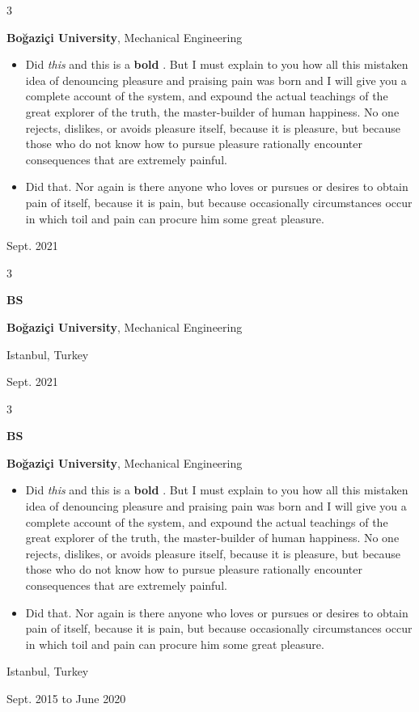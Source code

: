 \documentclass[10pt, letterpaper]{article}
\newenvironment{highlights}{
    \begin{itemize}[
        topsep=0.10 cm,
        parsep=0.10 cm,
        partopsep=0pt,
        itemsep=0pt,
        leftmargin=0.4 cm + 10pt
    ]
}{
    \end{itemize}
} %
\newenvironment{threecolentry}[3][]{
    \onecolentry
    \def\thirdColumn{#3}
    \setcolumnwidth{1 cm, \fill, 4.5 cm}
    \begin{paracol}{3}
    {\raggedright #2} \switchcolumn
}{
    \switchcolumn \raggedleft \thirdColumn
    \end{paracol}
    \endonecolentry
} %
\let\hrefWithoutArrow\href
\renewcommand{\href}[2]{\hrefWithoutArrow{#1}{\mbox{\ifthenelse{\equal{#2}{}}{ }{#2 }\raisebox{.15ex}{\footnotesize \faExternalLink*}}}}
\begin{document}
        \vspace{0.2 cm}

        \begin{threecolentry}{\textbf{}}{
            Sept. 2021
        }
            \textbf{Boğaziçi University}, Mechanical Engineering
            \begin{highlights}
                \item Did \textit{this} and this is a \textbf{bold} \href{https://example.com}{link}. But I must explain to you how all this mistaken idea of denouncing pleasure and praising pain was born and I will give you a complete account of the system, and expound the actual teachings of the great explorer of the truth, the master-builder of human happiness. No one rejects, dislikes, or avoids pleasure itself, because it is pleasure, but because those who do not know how to pursue pleasure rationally encounter consequences that are extremely painful.
                \item Did that. Nor again is there anyone who loves or pursues or desires to obtain pain of itself, because it is pain, but because occasionally circumstances occur in which toil and pain can procure him some great pleasure.
            \end{highlights}
        \end{threecolentry}

        \vspace{0.2 cm}

        \begin{threecolentry}{\textbf{BS}}{
            Istanbul, Turkey

        Sept. 2021
        }
            \textbf{Boğaziçi University}, Mechanical Engineering
        \end{threecolentry}

        \vspace{0.2 cm}

        \begin{threecolentry}{\textbf{BS}}{
            Istanbul, Turkey

        Sept. 2015 to June 2020
        }
            \textbf{Boğaziçi University}, Mechanical Engineering
            \begin{highlights}
                \item Did \textit{this} and this is a \textbf{bold} \href{https://example.com}{link}. But I must explain to you how all this mistaken idea of denouncing pleasure and praising pain was born and I will give you a complete account of the system, and expound the actual teachings of the great explorer of the truth, the master-builder of human happiness. No one rejects, dislikes, or avoids pleasure itself, because it is pleasure, but because those who do not know how to pursue pleasure rationally encounter consequences that are extremely painful.
                \item Did that. Nor again is there anyone who loves or pursues or desires to obtain pain of itself, because it is pain, but because occasionally circumstances occur in which toil and pain can procure him some great pleasure.
            \end{highlights}
        \end{threecolentry}
\end{document}
